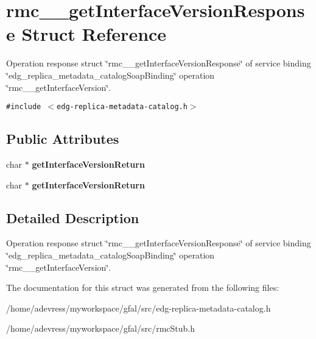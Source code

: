 \section{rmc\_\-\_\-get\-Interface\-Version\-Response Struct Reference}
\label{structrmc____getInterfaceVersionResponse}
Operation response struct \char`\"{}rmc\_\-\_\-get\-Interface\-Version\-Response\char`\"{} of service binding \char`\"{}edg\_\-replica\_\-metadata\_\-catalog\-Soap\-Binding\char`\"{} operation \char`\"{}rmc\_\-\_\-get\-Interface\-Version\char`\"{}.  


{\tt \#include $<$edg-replica-metadata-catalog.h$>$}

\subsection*{Public Attributes}
\begin{CompactItemize}
\item 
char $\ast$ \textbf{get\-Interface\-Version\-Return}\label{structrmc____getInterfaceVersionResponse_fe1851c2b0b2f5182fc7f9ed84b5b96a}

\item 
char $\ast$ \textbf{get\-Interface\-Version\-Return}\label{structrmc____getInterfaceVersionResponse_fe1851c2b0b2f5182fc7f9ed84b5b96a}

\end{CompactItemize}


\subsection{Detailed Description}
Operation response struct \char`\"{}rmc\_\-\_\-get\-Interface\-Version\-Response\char`\"{} of service binding \char`\"{}edg\_\-replica\_\-metadata\_\-catalog\-Soap\-Binding\char`\"{} operation \char`\"{}rmc\_\-\_\-get\-Interface\-Version\char`\"{}. 



The documentation for this struct was generated from the following files:\begin{CompactItemize}
\item 
/home/adevress/myworkspace/gfal/src/edg-replica-metadata-catalog.h\item 
/home/adevress/myworkspace/gfal/src/rmc\-Stub.h\end{CompactItemize}

